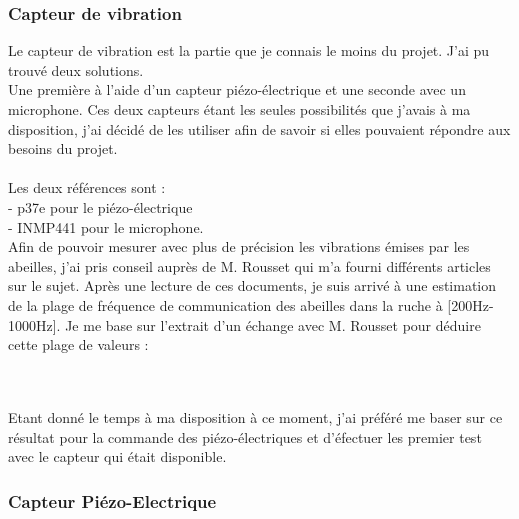 \documentclass[12pt,french,a4paper]{article}
\begin{document}
\subsubsection{Capteur de vibration}
Le capteur de vibration est la partie que je connais le moins du projet. J'ai pu trouvé deux solutions.\\
 Une première à l'aide d'un capteur piézo-électrique et une seconde avec un  microphone. Ces deux capteurs étant les seules possibilités que j'avais à ma disposition, 
 j'ai décidé de les utiliser afin de savoir si elles pouvaient répondre aux besoins du projet.\\
\\
 Les deux références sont :\\
- p37e pour le piézo-électrique\\
- INMP441 pour le microphone.\\

Afin de pouvoir mesurer avec plus de précision les vibrations émises par les abeilles, j'ai pris conseil auprès de M. Rousset qui m'a fourni différents articles sur le sujet.
Après une lecture de ces documents, je suis arrivé à une estimation de la plage de fréquence de communication des abeilles dans la ruche à [200Hz-1000Hz]. Je me base sur l'extrait d'un échange avec M. Rousset pour déduire cette plage de valeurs : \\ 
\\
\\


Etant donné le temps à ma disposition à ce moment, j'ai préféré me baser sur ce résultat pour la commande des piézo-électriques et d'éfectuer les premier test avec le capteur qui était disponible. 

\subsubsection{Capteur Piézo-Electrique}
\end{document}
